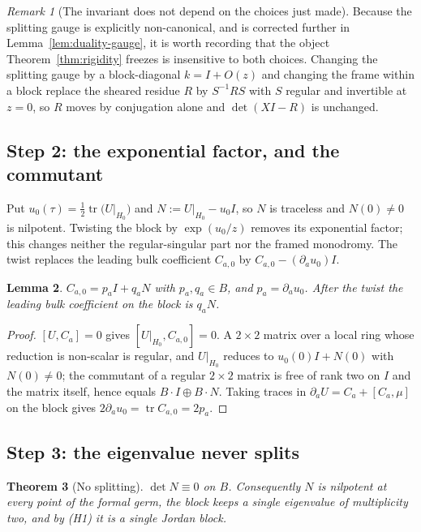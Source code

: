 \documentclass[11pt]{article}
\newtheorem{theorem}{Theorem}
\newtheorem{lemma}[theorem]{Lemma}
\theoremstyle{definition}
\theoremstyle{remark}
\newtheorem{remark}[theorem]{Remark}
\begin{document}
\begin{remark}[The invariant does not depend on the choices just made]
\label{rem:gauge-independence}
Because the splitting gauge is explicitly non-canonical, and is corrected further
in Lemma~\ref{lem:duality-gauge}, it is worth recording that the object
Theorem~\ref{thm:rigidity} freezes is insensitive to both choices. Changing the
splitting gauge by a block-diagonal $k=I+O(z)$ and changing the frame within a
block replace the sheared residue $R$ by $S^{-1}RS$ with $S$ regular and
invertible at $z=0$, so $R$ moves by conjugation alone and $\det(XI-R)$ is
unchanged.
\end{remark}

\subsection*{Step 2: the exponential factor, and the commutant}

Put $u_0(\tau)=\tfrac12\operatorname{tr}\bigl(U|_{H_0}\bigr)$ and
$N:=U|_{H_0}-u_0I$, so $N$ is traceless and $N(0)\ne0$ is nilpotent. Twisting
the block by $\exp(u_0/z)$ removes its exponential factor; this changes neither
the regular-singular part nor the framed monodromy. The twist replaces the
leading bulk coefficient $C_{a,0}$ by $C_{a,0}-(\partial_au_0)I$.

\begin{lemma}
\label{lem:commutant}
$C_{a,0}=p_aI+q_aN$ with $p_a,q_a\in B$, and $p_a=\partial_au_0$. After the
twist the leading bulk coefficient on the block is $q_aN$.
\end{lemma}

\begin{proof}
$[U,C_a]=0$ gives $[U|_{H_0},C_{a,0}]=0$. A $2\times2$ matrix over a local ring
whose reduction is non-scalar is regular, and $U|_{H_0}$ reduces to
$u_0(0)I+N(0)$ with $N(0)\ne0$; the commutant of a regular $2\times2$ matrix is
free of rank two on $I$ and the matrix itself, hence equals
$B\cdot I\oplus B\cdot N$. Taking traces in $\partial_aU=C_a+[C_a,\mu]$ on the
block gives $2\partial_au_0=\operatorname{tr}C_{a,0}=2p_a$.
\end{proof}

\subsection*{Step 3: the eigenvalue never splits}

\begin{theorem}[No splitting]
\label{thm:no-splitting}
$\det N\equiv0$ on $B$. Consequently $N$ is nilpotent at every point of the
formal germ, the block keeps a single eigenvalue of multiplicity two, and by
(H1) it is a single Jordan block.
\end{theorem}
\end{document}

